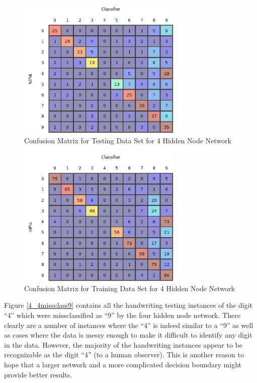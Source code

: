 \documentclass{article}
\begin{document}
\begin{figure}
\centering
\includegraphics[width=0.7\textwidth]{data/final/4_test_confusion.png}
\caption{Confusion Matrix for Testing Data Set for 4 Hidden Node Network}
\label{testconfusion4}
\end{figure}

\begin{figure}
\centering
\includegraphics[width=0.7\textwidth]{data/final/4_train_confusion.png}
\caption{Confusion Matrix for Training Data Set for 4 Hidden Node Network}
\label{trainconfusion4}
\end{figure}

Figure \ref{4_4missclass9} contains all the handwriting testing instances of the digit ``4'' which were missclassified as ``9'' by the four hidden node network. There clearly are a number of instances where the ``4'' is indeed similar to a ``9'' as well as cases where the data is messy enough to make it difficult to identify any digit in the data. However, the majority of the handwriting instances appear to be recognizable as the digit ``4'' (to a human observer). This is another reason to hope that a larger network and a more complicated decision boundary might provide better results.
\end{document}
